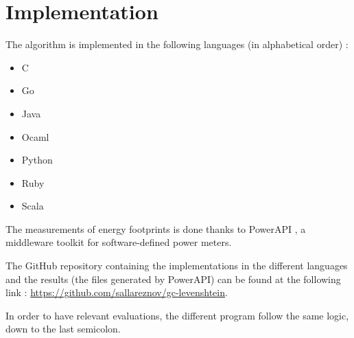 \section{Implementation}
\label{sec:Implementation}
The algorithm is implemented in the following languages (in alphabetical order) :
\begin{multicols}{2}
	\begin{itemize}
		\item C
		\item Go
		\item Java
		\item Ocaml
		\item Python
		\item Ruby
		\item Scala
	\end{itemize}
\end{multicols}

The measurements of energy footprints is done thanks to PowerAPI \cite{powerapi-website}\cite{powerapi-github}, a middleware toolkit for software-defined power meters.

The GitHub repository containing the implementations in the different languages and the results (the files generated by PowerAPI) can be found at the following link : \url{https://github.com/sallareznov/gc-levenshtein}.

In order to have relevant evaluations, the different program follow the same logic, down to the last semicolon.
